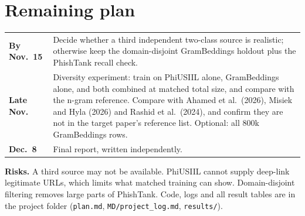 \documentclass[10pt]{article}
\begin{document}
\section{Remaining plan}
\begin{tabular}{@{}p{1.1in}p{5.8in}@{}}
\textbf{By Nov.\ 15} & Decide whether a third independent two-class source is realistic; otherwise keep the domain-disjoint GramBeddings holdout plus the PhishTank recall check. \\
\textbf{Late Nov.} & Diversity experiment: train on PhiUSIIL alone, GramBeddings alone, and both combined at matched total size, and compare with the n-gram reference. Compare with Ahamed et al.\ (2026), Misiek and Hyla (2026) and Rashid et al.\ (2024), and confirm they are not in the target paper's reference list. Optional: all 800k GramBeddings rows. \\
\textbf{Dec.\ 8} & Final report, written independently. \\
\end{tabular}

\textbf{Risks.} A third source may not be available. PhiUSIIL cannot supply deep-link legitimate URLs, which limits what matched training can show. Domain-disjoint filtering removes large parts of PhishTank. Code, logs and all result tables are in the project folder (\texttt{plan.md}, \texttt{MD/project\_log.md}, \texttt{results/}).
\end{document}
